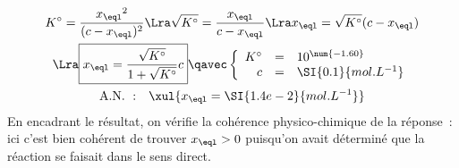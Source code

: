 \documentclass[../TDTM2.tex]{subfiles}%
\begin{document}
{\begin{gather*}
	K^\circ = \frac{x_{\eql}{}^2}{(c-x_{\eql})^2}
	\Lra
	\sqrt{K^\circ} = \frac{x_{\eql}}{c-x_{\eql}}
	\Lra
	x_{\eql} = \sqrt{K^\circ}(c-x_{\eql})\\
	\Lra
	\boxed{x_{\eql} = \frac{\sqrt{K^\circ}}{1+ \sqrt{K^\circ}}c}
	\qavec
	\left\{
	\begin{array}{rcl}
		K^\circ & = & 10^{\num{-1.60}}     \\
		c       & = & \SI{0.1}{mol.L^{-1}}
	\end{array}
	\right.\\
	\mathrm{A.N.~:}\quad
	\xul{x_{\eql} = \SI{1.4e-2}{mol.L^{-1}}}
\end{gather*}
En encadrant le résultat, on vérifie la cohérence physico-chimique de la
réponse~: ici c'est bien cohérent de trouver $x_{\eql} > 0$ puisqu'on
avait déterminé que la réaction se faisait dans le sens direct.
}
\end{document}
